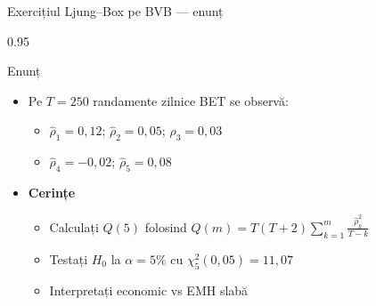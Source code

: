\documentclass[9pt, aspectratio=169, t]{beamer}
\begin{document}
\begin{frame}[shrink=15]{Exercițiul Ljung--Box pe BVB --- enunț}
\begin{cminipage}{0.95\textwidth}
\begin{block}{Enunț}
\begin{itemize}\setlength{\itemsep}{0pt}
    \item Pe $T = 250$ randamente zilnice BET se observă:
    \begin{itemize}\setlength{\itemsep}{0pt}
        \item $\hat\rho_1 = 0{,}12$; $\hat\rho_2 = 0{,}05$; $\hat\rho_3 = 0{,}03$
        \item $\hat\rho_4 = -0{,}02$; $\hat\rho_5 = 0{,}08$
    \end{itemize}
\end{itemize}
\end{block}

\begin{itemize}\setlength{\itemsep}{0pt}
    \item \textbf{Cerințe}
    \begin{itemize}\setlength{\itemsep}{0pt}
        \item Calculați $Q(5)$ folosind $Q(m) = T(T+2)\sum_{k=1}^{m}\frac{\hat\rho_k^2}{T-k}$
        \item Testați $H_0$ la $\alpha = 5\%$ cu $\chi^2_5(0{,}05) = 11{,}07$
        \item Interpretați economic vs EMH slabă
    \end{itemize}
\end{itemize}
\end{cminipage}
\end{frame}
\end{document}
